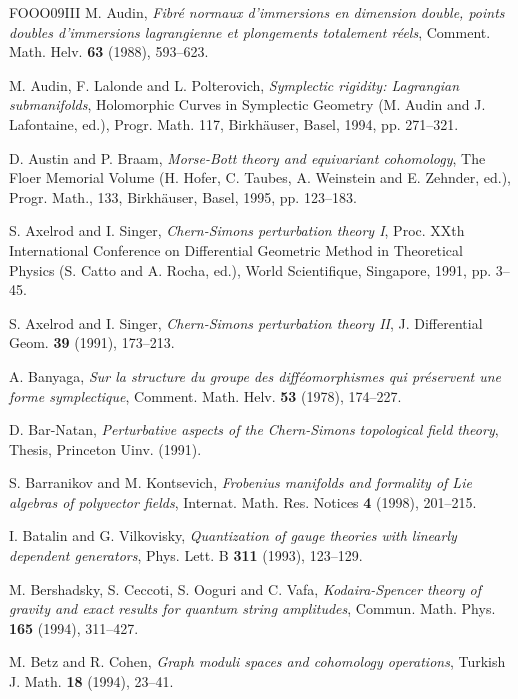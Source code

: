 \begin{thebibliography}{FOOO09III}
 M. Audin, \emph{Fibré normaux d'immersions en dimension double, points doubles d'immersions lagrangienne et plongements totalement réels}, Comment. Math. Helv. \textbf{63} (1988), 593–623.

 M. Audin, F. Lalonde and L. Polterovich, \emph{Symplectic rigidity: Lagrangian submanifolds}, Holomorphic Curves in Symplectic Geometry (M. Audin and J. Lafontaine, ed.), Progr. Math. 117, Birkhäuser, Basel, 1994, pp. 271–321.

 D. Austin and P. Braam, \emph{Morse-Bott theory and equivariant cohomology}, The Floer Memorial Volume (H. Hofer, C. Taubes, A. Weinstein and E. Zehnder, ed.), Progr. Math., 133, Birkhäuser, Basel, 1995, pp. 123–183.

 S. Axelrod and I. Singer, \emph{Chern-Simons perturbation theory I}, Proc. XXth International Conference on Differential Geometric Method in Theoretical Physics (S. Catto and A. Rocha, ed.), World Scientifique, Singapore, 1991, pp. 3–45.

 S. Axelrod and I. Singer, \emph{Chern-Simons perturbation theory II}, J. Differential Geom. \textbf{39} (1991), 173–213.

 A. Banyaga, \emph{Sur la structure du groupe des difféomorphismes qui préservent une forme symplectique}, Comment. Math. Helv. \textbf{53} (1978), 174–227.

 D. Bar-Natan, \emph{Perturbative aspects of the Chern-Simons topological field theory}, Thesis, Princeton Uinv. (1991).

 S. Barranikov and M. Kontsevich, \emph{Frobenius manifolds and formality of Lie algebras of polyvector fields}, Internat. Math. Res. Notices \textbf{4} (1998), 201–215.

 I. Batalin and G. Vilkovisky, \emph{Quantization of gauge theories with linearly dependent generators}, Phys. Lett. B \textbf{311} (1993), 123–129.

 M. Bershadsky, S. Ceccoti, S. Ooguri and C. Vafa, \emph{Kodaira-Spencer theory of gravity and exact results for quantum string amplitudes}, Commun. Math. Phys. \textbf{165} (1994), 311–427.

 M. Betz and R. Cohen, \emph{Graph moduli spaces and cohomology operations}, Turkish J. Math. \textbf{18} (1994), 23–41.


\end{thebibliography}
